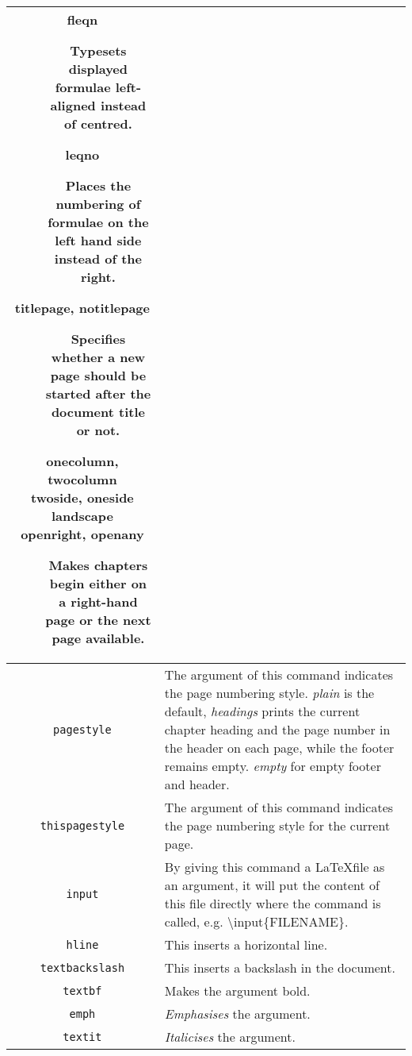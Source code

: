\begin{longtable}{|c|p{}|}
\begin{description}
\item[fleqn] Typesets displayed formulae left-aligned instead of centred.

\item[leqno] Places the numbering of formulae on the left hand side instead of the right.

\item[titlepage, notitlepage] Specifies whether a new page should be started after the document title or not.

\item[onecolumn, twocolumn]

\item[twoside, oneside]

\item[landscape]

\item[openright, openany] Makes chapters begin either on a right-hand page or the next page available.
\end{description}

\\
\hline

\verb|pagestyle| & The argument of this command indicates the page numbering style. \textit{plain} is the default, \textit{headings} prints the current chapter heading and the page number in the header on each page, while the footer remains empty. \textit{empty} for empty footer and header.

\\
\hline

\verb|thispagestyle| & The argument of this command indicates the page numbering style for the current page.

\\
\hline
\verb|input| & By giving this command a \LaTeX file as an argument, it will put the content of this file directly where the command is called, e.g. \textbackslash{}input\{FILENAME\}.

\\
\hline
\verb|hline| & This inserts a horizontal line.

\\
\hline
\verb|textbackslash| & This inserts a backslash in the document.

\\
\hline
\verb|textbf| & Makes the argument bold.

\\
\hline
\verb|emph| & \emph{Emphasises} the argument.

\\
\hline
\verb|textit| & \textit{Italicises} the argument.


\end{longtable}
